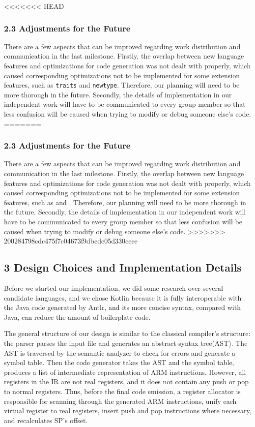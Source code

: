 \documentclass[10pt,a4paper,]{report}
\begin{document}
<<<<<<< HEAD
  \subsubsection*{2.3 Adjustments for the Future}
  There are a few aspects that can be improved regarding work distribution and
  communication in the last milestone. Firstly, the overlap between new language
  features and optimizations for code generation was not dealt with properly,
  which caused corresponding optimizations not to be implemented for some
  extension features, such as \texttt{traits} and \texttt{newtype}. Therefore, our
  planning will need to be more thorough in the future. Secondly, the details of
  implementation in our independent work will have to be communicated to every
  group member so that less confusion will be caused when trying to modify or
  debug someone else’s code.
=======
  \subsubsection*{2.3	Adjustments for the Future}
  There are a few aspects that can be improved regarding work distribution and communication
   in the last milestone. Firstly, the overlap between new language features and 
   optimizations for code generation was not dealt with properly, which caused corresponding 
   optimizations not to be implemented for some extension features, such as  and 
   . Therefore, our planning will need to be more thorough in the future. 
   Secondly, the details of implementation in our independent work will have to be communicated 
   to every group member so that less confusion will be caused when trying to modify or debug 
   someone else’s code.
>>>>>>> 200284798cdc475f7e04673f9dbede05d330ceee

  \subsection*{3 Design Choices and Implementation Details}
  Before we started our implementation, we did some research over several
  candidate languages, and we chose Kotlin because it is fully interoperable
  with the Java code generated by Antlr, and its more concise syntax, compared
  with Java, can reduce the amount of boilerplate code.

  The general structure of our design is similar to the classical compiler's
  structure: the parser parses the input file and generates an abstract syntax
  tree(AST). The AST is traversed by the semantic analyzer to check for errors
  and generate a symbol table. Then the code generator takes the AST and the
  symbol table, produces a list of intermediate representation of ARM
  instructions. However, all registers in the IR are not real registers, and it
  does not contain any push or pop to normal registers. Thus, before the final
  code emission, a register allocator is responsible for scanning through the
  generated ARM instructions, unify each virtual register to real registers,
  insert push and pop instructions where necessary, and recalculates SP's offset.
\end{document}
